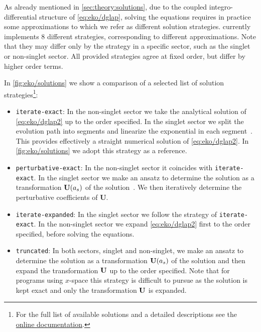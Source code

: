 As already mentioned in \cref{sec:theory:solutions}, due to
the coupled integro-differential structure of \cref{eq:eko/dglap}, 
solving the equations requires in practice some approximations to which we refer as different
solution strategies. \eko{} currently implements 8 different strategies,
corresponding to different approximations.
Note that they may differ only by the strategy in a specific sector,
such as the singlet or non-singlet sector. All provided strategies
agree at fixed order, but differ by higher order terms.

In \cref{fig:eko/solutions} we show a comparison of a selected list of
solution strategies\footnote{For the full list of available solutions and a
detailed descriptions see the
\href{https://eko.readthedocs.io/en/latest}{online documentation}.}:

\begin{itemize}
    \item \texttt{iterate-exact}:
        In the non-singlet sector we take the analytical solution
        of \cref{eq:eko/dglap2} up to the order specified.
        In the singlet sector we split the evolution path into segments
        and linearize the exponential in each segment~\cite{Bonvini:2012sh}.
        This provides effectively a straight numerical solution of \cref{eq:eko/dglap2}.
        In \cref{fig:eko/solutions} we adopt this strategy as a reference.
    \item \texttt{perturbative-exact}:
        In the non-singlet sector it coincides with \texttt{iterate-exact}.
        In the singlet sector we make an ansatz to determine the solution as a
        transformation $\vb{U}(a_s)$ of the \lo{} solution~\cite{Vogt:2004ns}. We then
        iteratively determine the perturbative coefficients of $\textbf{U}$.
    \item \texttt{iterate-expanded}:
        In the singlet sector we follow the strategy of \texttt{iterate-exact}.
        In the non-singlet sector we expand \cref{eq:eko/dglap2} first to the order
        specified, before solving the equations.
    \item \texttt{truncated}: 
        In both sectors, singlet and non-singlet, we make an ansatz to determine the solution as a
        transformation $\vb{U}(a_s)$ of the \lo{} solution and
        then expand the transformation $\vb U$ up to the order specified.
        Note that for programs using $x$-space this strategy is difficult
        to pursue as the \lo{} solution is kept exact and only the transformation
        $\vb U$ is expanded.
\end{itemize}

